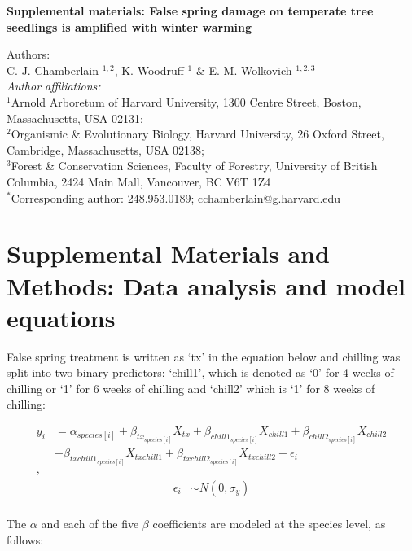 \documentclass{article}\usepackage[]{graphicx}\usepackage[]{color}
\begin{document}
\noindent \textbf{\Large{Supplemental materials: False spring damage on temperate tree seedlings is amplified with winter warming}}

\noindent Authors:\\
C. J. Chamberlain $^{1,2}$, K. Woodruff $^{1}$ \& E. M. Wolkovich $^{1,2,3}$
\vspace{2ex}\\
\emph{Author affiliations:}\\
$^{1}$Arnold Arboretum of Harvard University, 1300 Centre Street, Boston, Massachusetts, USA 02131; \\
$^{2}$Organismic \& Evolutionary Biology, Harvard University, 26 Oxford Street, Cambridge, Massachusetts, USA 02138; \\
$^{3}$Forest \& Conservation Sciences, Faculty of Forestry, University of British Columbia, 2424 Main Mall, Vancouver, BC V6T 1Z4\\
\vspace{2ex}
$^*$Corresponding author: 248.953.0189; cchamberlain@g.harvard.edu\\

\renewcommand{\thetable}{S\arabic{table}}
\renewcommand{\thefigure}{S\arabic{figure}}
\renewcommand{\labelitemi}{$-$}



\section*{Supplemental Materials and Methods: Data analysis and model equations}
False spring treatment is written as `tx' in the equation below and chilling was split into two binary predictors: `chill1', which is denoted as `0' for 4 weeks of chilling or `1' for 6 weeks of chilling and `chill2' which is `1' for 8 weeks of chilling:

\begin{align*}
y_i &= \alpha_{species[i]} + \beta_{tx_{species[i]}}X_{tx} + \beta_{chill1_{species[i]}}X_{chill1} + \beta_{chill2_{species[i]}}X_{chill2}\\
&+ \beta_{txchill1_{species[i]}}X_{txchill1} + \beta_{txchill2_{species[i]}}X_{txchill2} + \epsilon_i \tag{1}\\,
\end{align*}
\begin{align*}
\epsilon_i & \sim N(0,\sigma_y) \\
\end{align*}

The $\alpha$ and each of the five $\beta$ coefficients are modeled at the species level, as follows:
\end{document}
